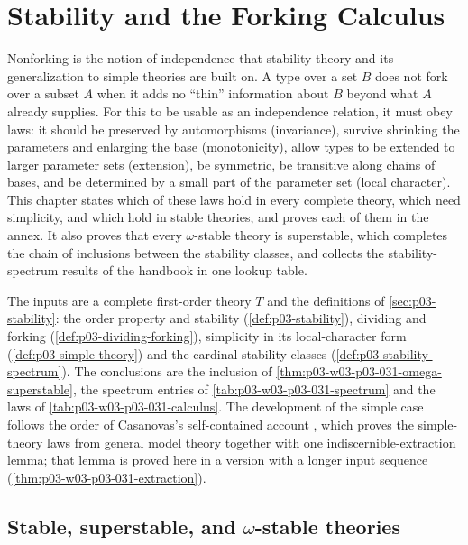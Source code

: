 \chapter{Stability and the Forking Calculus}
\label{sec:p03-w03-p03-031-forking-calculus}

Nonforking is the notion of independence that stability theory and its
generalization to simple theories are built on.  A type over a set \(B\)
does not fork over a subset \(A\) when it adds no ``thin'' information
about \(B\) beyond what \(A\) already supplies.  For this to be usable as
an independence relation, it must obey laws: it should be preserved by
automorphisms (invariance), survive shrinking the parameters and enlarging
the base (monotonicity), allow types to be extended to larger parameter
sets (extension), be symmetric, be transitive along chains of bases, and
be determined by a small part of the parameter set (local character).
This chapter states which of these laws hold in every complete theory,
which need simplicity, and which hold in stable theories, and proves each
of them in the annex.  It also proves that every \(\omega\)-stable theory
is superstable, which completes the chain of inclusions between the
stability classes, and collects the stability-spectrum results of the
handbook in one lookup table.

The inputs are a complete first-order theory \(T\) and the definitions of
\cref{sec:p03-stability}: the order property and stability
(\cref{def:p03-stability}), dividing and forking
(\cref{def:p03-dividing-forking}), simplicity in its local-character form
(\cref{def:p03-simple-theory}) and the cardinal stability classes
(\cref{def:p03-stability-spectrum}).  The conclusions are the inclusion
of \cref{thm:p03-w03-p03-031-omega-superstable}, the spectrum entries of
\cref{tab:p03-w03-p03-031-spectrum} and the laws of
\cref{tab:p03-w03-p03-031-calculus}.  The development of the simple case
follows the order of Casanovas's self-contained account
\cite[\S\S~3--5, pp.~266--273]{Casanovas2007Simplicity}, which proves the
simple-theory laws from general model theory together with one
indiscernible-extraction lemma; that lemma is proved here in a version
with a longer input sequence (\cref{thm:p03-w03-p03-031-extraction}).

\section{Stable, superstable, and \texorpdfstring{\(\omega\)}{omega}-stable theories}
\label{sec:p03-w03-p03-031-classes}

